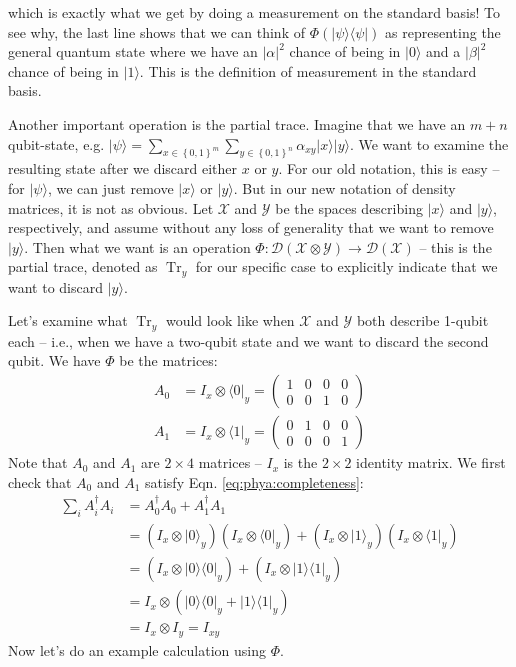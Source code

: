 \documentclass[11pt]{article}
\newcommand{\abs}[1]{\left\lvert #1 \right\rvert}
\newcommand{\set}[1]{\left\{ #1 \right\}}
\newcommand{\tr}{\operatorname{Tr}}
\newcommand{\bra}[1]{\langle #1 \rvert}
\newcommand{\ket}[1]{\lvert #1 \rangle}
\newcommand{\kret}[2]{\ket{#1}\bra{#2}}
\newcommand{\kera}[1]{\kret{#1}{#1}}
\def\X{\mathcal{X}}
\def\Y{\mathcal{Y}}
\def\D{\mathcal{D}}
\def\fill{   \hfill}
\begin{document}
which is exactly what we get by doing a measurement on the standard basis! To see why, the last line shows that we can think of $\Phi(\kera{\psi})$ as representing the general quantum state where we have an $\abs{\alpha}^2$ chance of being in $\ket{0}$ and a $\abs{\beta}^2$ chance of being in $\ket{1}$. This is the definition of measurement in the standard basis.

\fill

\noindent Another important operation is the partial trace. Imagine that we have an $m + n$ qubit-state, e.g. $\ket{\psi} = \sum_{x \in \set{0, 1}^m}\sum_{y \in \set{0, 1}^n} \alpha_{xy}\ket{x}\ket{y}$. We want to examine the resulting state after we discard either $x$ or $y$. For our old notation, this is easy -- for $\ket{\psi}$, we can just remove $\ket{x}$ or $\ket{y}$. But in our new notation of density matrices, it is not as obvious. Let $\X$ and $\Y$ be the spaces describing $\ket{x}$ and $\ket{y}$, respectively, and assume without any loss of generality that we want to remove $\ket{y}$. Then what we want is an operation $\Phi: \D(\X \otimes \Y) \rightarrow \D(\X)$ -- this is the partial trace, denoted as $\tr_y$ for our specific case to explicitly indicate that we want to discard $\ket{y}$.

\fill
  
\noindent Let's examine what $\tr_y$ would look like when $\X$ and $\Y$ both describe 1-qubit each -- i.e., when we have a two-qubit state and we want to discard the second qubit. We have $\Phi$ be the matrices:
\begin{equation*}
\begin{split}
A_0 &= I_x \otimes \bra{0}_y = \left(\begin{array}{cccc}
1 & 0 & 0 & 0 \\
0 & 0 & 1 & 0
\end{array}\right) \\
A_1 &= I_x \otimes \bra{1}_y = \left(\begin{array}{cccc}
0 & 1 & 0 & 0 \\
0 & 0 & 0 & 1
\end{array}\right)
\end{split}
\end{equation*}
Note that $A_0$ and $A_1$ are $2 \times 4$ matrices -- $I_x$ is the $2 \times 2$ identity matrix. We first check that $A_0$ and $A_1$ satisfy Eqn. \ref{eq:phya:completeness}:
\begin{align*}
\sum_{i} A^\dag_iA_i
&= A^\dag_0A_0 + A^\dag_1A_1 \\
&= (I_x \otimes \ket{0}_y)(I_x \otimes \bra{0}_y)
+  (I_x \otimes \ket{1}_y)(I_x \otimes \bra{1}_y) \\
&= (I_x \otimes \kera{0}_y) + (I_x \otimes \kera{1}_y) \\
&= I_x \otimes (\kera{0}_y + \kera{1}_y) \\
&= I_x \otimes I_y = I_{xy}
\end{align*}
Now let's do an example calculation using $\Phi$.
\end{document}
